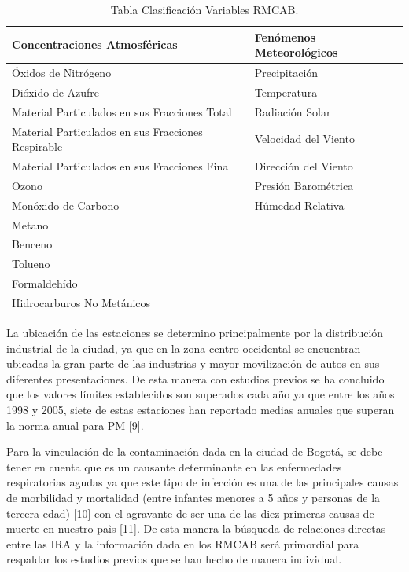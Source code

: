 \documentclass[a4paper, 11pt, oneside]{article}
\theoremstyle{definition}
\theoremstyle{remark}
\begin{document}
\begin{table}[htbp]
\begin{center}
\begin{tabular}{|l|l|}
\hline
Concentraciones Atmosféricas & Fenómenos  Meteorológicos \\
\hline \hline
Óxidos de Nitrógeno & Precipitación \\ \hline
Dióxido de Azufre & Temperatura \\ \hline
Material Particulados en sus Fracciones Total & Radiación Solar \\ \hline
Material Particulados en sus Fracciones Respirable & Velocidad del Viento \\ \hline
Material Particulados en sus Fracciones Fina & Dirección del Viento \\ \hline
Ozono & Presión Barométrica \\ \hline
Monóxido de Carbono & Húmedad Relativa \\ \hline
Metano &  \\ \hline
Benceno &  \\ \hline
Tolueno &  \\ \hline
Formaldehído &  \\ \hline
Hidrocarburos No Metánicos & \\ \hline
\end{tabular}
\caption{Tabla Clasificación Variables RMCAB.}
\label{tabla:sencilla}
\end{center}
\end{table}


La ubicación de las estaciones se determino principalmente por la distribución  industrial de la ciudad, ya que en la zona centro occidental se encuentran ubicadas la gran parte de las industrias y mayor movilización de autos en sus diferentes presentaciones. De esta manera con estudios previos se ha concluido que los valores límites establecidos son superados cada año ya que entre los años 1998 y 2005, siete de estas estaciones han reportado medias anuales que superan la norma anual para PM [9].

Para la vinculación de la contaminación dada en la ciudad de Bogotá, se debe tener en cuenta que es un causante determinante en las enfermedades respiratorias agudas ya que este tipo de infección es una de las principales causas de morbilidad y mortalidad (entre infantes menores a 5 años y personas de la tercera edad) [10] con el agravante de ser una de las diez primeras causas de muerte en nuestro paìs [11]. De esta manera la búsqueda de relaciones directas entre las IRA y la información dada en los RMCAB será primordial para respaldar los estudios previos que se han hecho de manera individual. 
\end{document}
